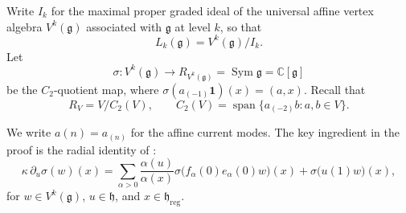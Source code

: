 \documentclass[11pt,reqno]{amsart}
\theoremstyle{remark}
\newcommand{\g}{\mathfrak g}
\newcommand{\h}{\mathfrak h}
\newcommand{\C}{\mathbb C}
\newcommand{\Sym}{\operatorname{Sym}}
\begin{document}
Write $I_k$ for the maximal proper graded ideal of the universal
affine vertex algebra $V^k(\g)$ associated with $\g$ at level $k$, so
that
\[
L_k(\g)=V^k(\g)/I_k.
\]
Let
\[
\sigma:V^k(\g)\longrightarrow R_{V^k(\g)}
=\Sym\g=\C[\g]
\]
be the $C_2$-quotient map, where
$\sigma(a_{(-1)}\mathbf1)(x)=(a,x)$. Recall that
\[
R_V=V/C_2(V),
\qquad
C_2(V)=\operatorname{span}\{a_{(-2)}b:a,b\in V\}.
\]

We write $a(n)=a_{(n)}$ for the affine current modes. The key
ingredient in the proof is the radial identity of
\cite[Lemma~2.1]{ADS}:
\begin{equation}
\label{eq:radial}
\kappa\,\partial_u\sigma(w)(x)
=
\sum_{\alpha>0}
\frac{\alpha(u)}{\alpha(x)}
\sigma\bigl(f_\alpha(0)e_\alpha(0)w\bigr)(x)
+
\sigma\bigl(u(1)w\bigr)(x),
\end{equation}
for $w\in V^k(\g)$, $u\in\h$, and
$x\in\h_{\mathrm{reg}}$.
\end{document}
